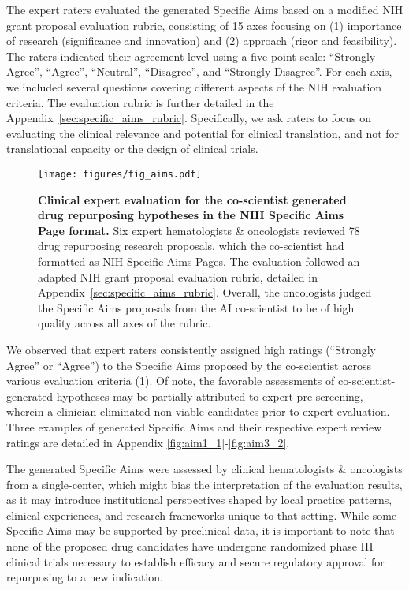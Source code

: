 The expert raters evaluated the generated Specific Aims based on a modified NIH grant proposal evaluation rubric, consisting of 15 axes focusing on (1) importance of research (significance and innovation) and (2) approach (rigor and feasibility). The raters indicated their agreement level using a five-point scale: ``Strongly Agree'', ``Agree'', ``Neutral'', ``Disagree'', and ``Strongly Disagree''. For each axis, we included several questions covering different aspects of the NIH evaluation criteria. The evaluation rubric is further detailed in the Appendix~\cref{sec:specific_aims_rubric}. Specifically, we ask raters to focus on evaluating the clinical relevance and potential for clinical translation, and not for translational capacity or the design of clinical trials.

\begin{figure}[htbp!]
\centering
\texttt{[image: figures/fig\_aims.pdf]}
\vspace{0.1cm}
\caption{\textbf{Clinical expert evaluation for the co-scientist generated drug repurposing hypotheses in the NIH Specific Aims Page format.} Six expert hematologists \& oncologists reviewed 78 drug repurposing research proposals, which the co-scientist had formatted as NIH Specific Aims Pages. The evaluation followed an adapted NIH grant proposal evaluation rubric, detailed in Appendix~\cref{sec:specific_aims_rubric}. Overall, the oncologists judged the Specific Aims proposals from the AI co-scientist to be of high quality across all axes of the rubric.}
\label{fig:fig_aim}
\end{figure}

We observed that expert raters consistently assigned high ratings (``Strongly Agree'' or ``Agree'') to the Specific Aims proposed by the co-scientist across various evaluation criteria (\cref{fig:fig_aim}). Of note, the favorable assessments of co-scientist-generated hypotheses may be partially attributed to expert pre-screening, wherein a clinician eliminated non-viable candidates prior to expert evaluation. Three examples of generated Specific Aims and their respective expert review ratings are detailed in Appendix \cref{fig:aim1_1}-\ref{fig:aim3_2}. 

The generated Specific Aims were assessed by clinical hematologists \& oncologists from a single-center, which might bias the interpretation of the evaluation results, as it may introduce institutional perspectives shaped by local practice patterns, clinical experiences, and research frameworks unique to that setting. While some Specific Aims may be supported by preclinical data, it is important to note that none of the proposed drug candidates have undergone randomized phase III clinical trials necessary to establish efficacy and secure regulatory approval for repurposing to a new indication.


